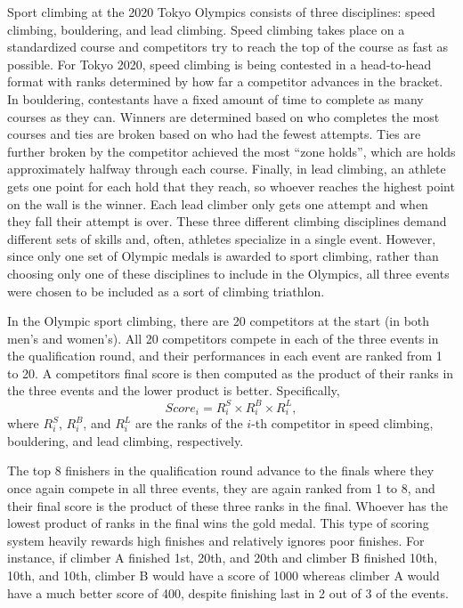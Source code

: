 \documentclass[12pt]{article}
\begin{document}
Sport climbing at the 2020 Tokyo Olympics consists of three disciplines:
speed climbing, bouldering, and lead climbing. Speed climbing takes
place on a standardized course and competitors try to reach the top of
the course as fast as possible. For Tokyo 2020, speed climbing is being
contested in a head-to-head format with ranks determined by how far a
competitor advances in the bracket. In bouldering, contestants have a
fixed amount of time to complete as many courses as they can. Winners
are determined based on who completes the most courses and ties are
broken based on who had the fewest attempts. Ties are further broken by
the competitor achieved the most ``zone holds'', which are holds
approximately halfway through each course. Finally, in lead climbing, an
athlete gets one point for each hold that they reach, so whoever reaches
the highest point on the wall is the winner. Each lead climber only gets
one attempt and when they fall their attempt is over. These three
different climbing disciplines demand different sets of skills and,
often, athletes specialize in a single event. However, since only one
set of Olympic medals is awarded to sport climbing, rather than choosing
only one of these disciplines to include in the Olympics, all three
events were chosen to be included as a sort of climbing triathlon.

In the Olympic sport climbing, there are 20 competitors at the start (in
both men's and women's). All 20 competitors compete in each of the three
events in the qualification round, and their performances in each event
are ranked from 1 to 20. A competitors final score is then computed as
the product of their ranks in the three events and the lower product is
better. Specifically, \[Score_i = R^S_i\times R^B_i\times R^L_i,\] where
\(R^S_i\), \(R^B_i\), and \(R^L_i\) are the ranks of the \(i\)-th
competitor in speed climbing, bouldering, and lead climbing,
respectively.

The top 8 finishers in the qualification round advance to the finals
where they once again compete in all three events, they are again ranked
from 1 to 8, and their final score is the product of these three ranks
in the final. Whoever has the lowest product of ranks in the final wins
the gold medal. This type of scoring system heavily rewards high
finishes and relatively ignores poor finishes. For instance, if climber
A finished 1st, 20th, and 20th and climber B finished 10th, 10th, and
10th, climber B would have a score of 1000 whereas climber A would have
a much better score of 400, despite finishing last in 2 out of 3 of the
events.
\end{document}
